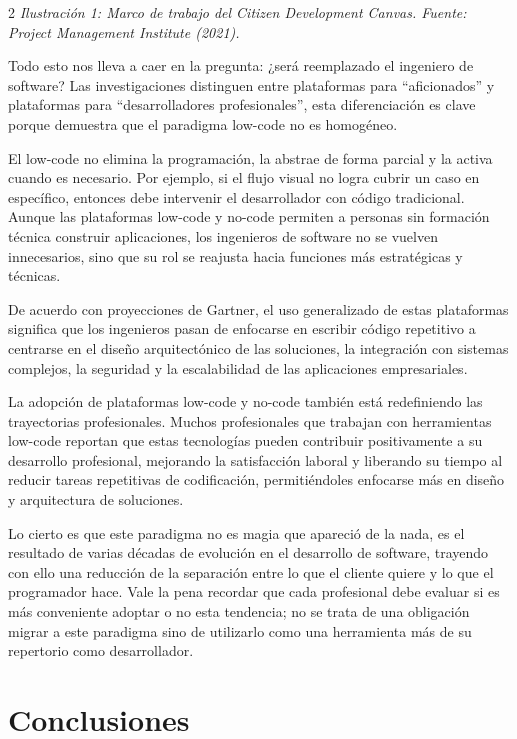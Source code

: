 \documentclass[10pt,spanish,Letterpaper,openany]{book}
\begin{document}
\begin {multicols}{2}
\emph{Ilustración 1: Marco de trabajo del Citizen Development Canvas. Fuente: Project Management Institute (2021).}

Todo esto nos lleva a caer en la pregunta: ¿será reemplazado el ingeniero de software? Las investigaciones distinguen entre plataformas para ``aficionados'' y plataformas para ``desarrolladores profesionales'', esta diferenciación es clave porque demuestra que el paradigma low-code no es homogéneo.

El low-code no elimina la programación, la abstrae de forma parcial y la activa cuando es necesario. Por ejemplo, si el flujo visual no logra cubrir un caso en específico, entonces debe intervenir el desarrollador con código tradicional. Aunque las plataformas low-code y no-code permiten a personas sin formación técnica construir aplicaciones, los ingenieros de software no se vuelven innecesarios, sino que su rol se reajusta hacia funciones más estratégicas y técnicas.

De acuerdo con proyecciones de Gartner, el uso generalizado de estas plataformas significa que los ingenieros pasan de enfocarse en escribir código repetitivo a centrarse en el diseño arquitectónico de las soluciones, la integración con sistemas complejos, la seguridad y la escalabilidad de las aplicaciones empresariales.

La adopción de plataformas low-code y no-code también está redefiniendo las trayectorias profesionales. Muchos profesionales que trabajan con herramientas low-code reportan que estas tecnologías pueden contribuir positivamente a su desarrollo profesional, mejorando la satisfacción laboral y liberando su tiempo al reducir tareas repetitivas de codificación, permitiéndoles enfocarse más en diseño y arquitectura de soluciones.

Lo cierto es que este paradigma no es magia que apareció de la nada, es el resultado de varias décadas de evolución en el desarrollo de software, trayendo con ello una reducción de la separación entre lo que el cliente quiere y lo que el programador hace. Vale la pena recordar que cada profesional debe evaluar si es más conveniente adoptar o no esta tendencia; no se trata de una obligación migrar a este paradigma sino de utilizarlo como una herramienta más de su repertorio como desarrollador.

\section{Conclusiones}\label{conclusiones-4}


\end{multicols}
\end{document}
